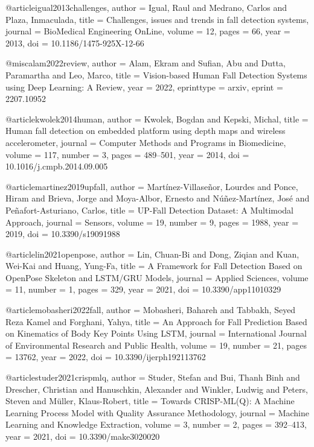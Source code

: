 
@article{igual2013challenges,
  author  = {Igual, Raul and Medrano, Carlos and Plaza, Inmaculada},
  title   = {Challenges, issues and trends in fall detection systems},
  journal = {BioMedical Engineering OnLine},
  volume  = {12},
  pages   = {66},
  year    = {2013},
  doi     = {10.1186/1475-925X-12-66}
}

@misc{alam2022review,
  author       = {Alam, Ekram and Sufian, Abu and Dutta, Paramartha and Leo, Marco},
  title        = {Vision-based Human Fall Detection Systems using Deep Learning: A Review},
  year         = {2022},
  eprinttype   = {arxiv},
  eprint       = {2207.10952}
}

@article{kwolek2014human,
  author  = {Kwolek, Bogdan and Kepski, Michal},
  title   = {Human fall detection on embedded platform using depth maps and wireless accelerometer},
  journal = {Computer Methods and Programs in Biomedicine},
  volume  = {117},
  number  = {3},
  pages   = {489--501},
  year    = {2014},
  doi     = {10.1016/j.cmpb.2014.09.005}
}

@article{martinez2019upfall,
  author  = {Mart{\'i}nez-Villase{\~n}or, Lourdes and Ponce, Hiram and Brieva, Jorge and Moya-Albor, Ernesto and N{\'u}{\~n}ez-Mart{\'i}nez, Jos{\'e} and Pe{\~n}afort-Asturiano, Carlos},
  title   = {{UP-Fall} Detection Dataset: A Multimodal Approach},
  journal = {Sensors},
  volume  = {19},
  number  = {9},
  pages   = {1988},
  year    = {2019},
  doi     = {10.3390/s19091988}
}

@article{lin2021openpose,
  author  = {Lin, Chuan-Bi and Dong, Ziqian and Kuan, Wei-Kai and Huang, Yung-Fa},
  title   = {A Framework for Fall Detection Based on {OpenPose} Skeleton and {LSTM/GRU} Models},
  journal = {Applied Sciences},
  volume  = {11},
  number  = {1},
  pages   = {329},
  year    = {2021},
  doi     = {10.3390/app11010329}
}

@article{mobasheri2022fall,
  author  = {Mobasheri, Bahareh and Tabbakh, Seyed Reza Kamel and Forghani, Yahya},
  title   = {An Approach for Fall Prediction Based on Kinematics of Body Key Points Using {LSTM}},
  journal = {International Journal of Environmental Research and Public Health},
  volume  = {19},
  number  = {21},
  pages   = {13762},
  year    = {2022},
  doi     = {10.3390/ijerph192113762}
}

@article{studer2021crispmlq,
  author  = {Studer, Stefan and Bui, Thanh Binh and Drescher, Christian and Hanuschkin, Alexander and Winkler, Ludwig and Peters, Steven and M{\"u}ller, Klaus-Robert},
  title   = {Towards {CRISP-ML(Q)}: A Machine Learning Process Model with Quality Assurance Methodology},
  journal = {Machine Learning and Knowledge Extraction},
  volume  = {3},
  number  = {2},
  pages   = {392--413},
  year    = {2021},
  doi     = {10.3390/make3020020}
}

